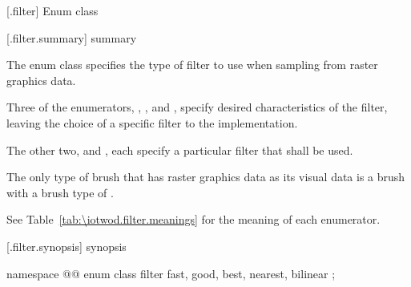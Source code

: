  [\iotwod.filter] {Enum class }

 [\iotwod.filter.summary] { summary}

\pnum
The  enum class specifies the type of filter to use when sampling from raster graphics data.

\pnum
Three of the  enumerators, , , and , specify desired characteristics of the filter, leaving the choice of a specific filter to the implementation. 

The other two,  and , each specify a particular filter that shall be used.

\pnum
\begin{note}
The only type of brush that has raster graphics data as its visual data is a brush with a brush type of .
\end{note}

\pnum
See Table~\ref{tab:\iotwod.filter.meanings} for the meaning of each
 enumerator.

 [\iotwod.filter.synopsis] { synopsis}

\begin{codeblock}
namespace @\fullnamespace{}@ {
  enum class filter {
    fast,
    good,
    best,
    nearest,
    bilinear
  };
}
\end{codeblock}

